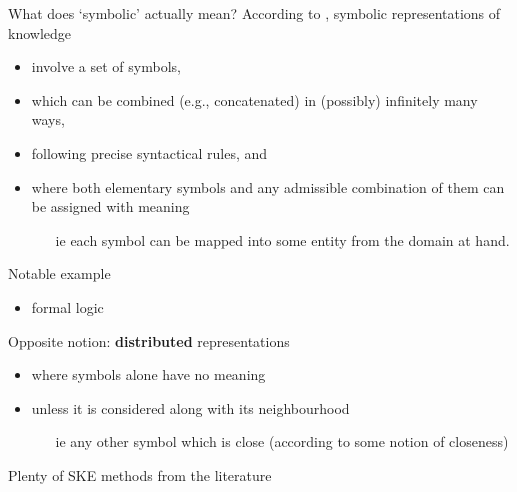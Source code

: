 \documentclass[presentation]{beamer}\mode<presentation>{\usetheme{AMSBolognaFC}}
\begin{document}
\begin{frame}[allowframebreaks]{What does `symbolic' actually mean?}
    According to \cite{Gelder90}, \alert{symbolic} representations of knowledge
    \begin{itemize}
        \item involve a \alert{set of symbols},
        \item which can be combined (e.g., concatenated) in (possibly) \alert{infinitely many} ways, 
        \item following precise \alert{syntactical} rules, and
        \item where both elementary symbols and any admissible combination of them can be assigned with \alert{meaning}
        \begin{itemize}
            \item[ie] \alert{each} symbol can be mapped into some entity from the domain at hand.
        \end{itemize}
    \end{itemize}
    
    \begin{exampleblock}{Notable example}
        \begin{itemize}
            \item formal logic
        \end{itemize}
    \end{exampleblock}

    \framebreak

    \begin{alertblock}{Opposite notion: \textbf{distributed} representations}
        \begin{itemize}
            \item where symbols \alert{alone} have no meaning
            \item unless it is considered along with its \alert{neighbourhood}
            \begin{itemize}
                \item[ie] any other symbol which is \alert{close} (according to some notion of closeness)
            \end{itemize}
        \end{itemize}
    \end{alertblock}
\end{frame}

\begin{frame}[allowframebreaks]{Plenty of SKE methods from the literature}
    
\end{frame}
\end{document}
